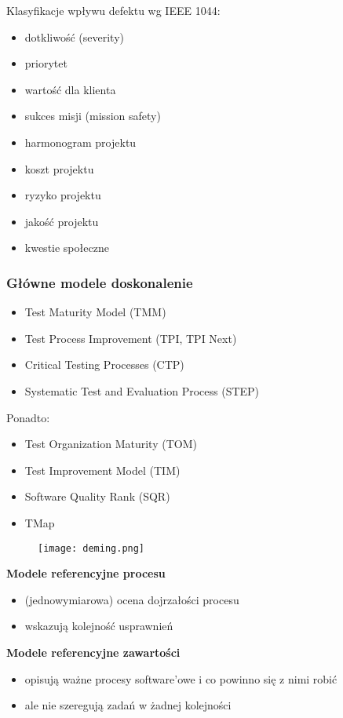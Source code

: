\documentclass[../main.tex]{subfiles}
\begin{document}
    Klasyfikacje wpływu defektu wg IEEE 1044:
    \begin{itemize}
        \item dotkliwość (severity)
        \item priorytet
        \item wartość dla klienta
        \item sukces misji (mission safety)
        \item harmonogram projektu
        \item koszt projektu
        \item ryzyko projektu
        \item jakość projektu
        \item kwestie społeczne
    \end{itemize}

    \subsubsection{Główne modele doskonalenie}
    \begin{itemize}
        \item Test Maturity Model (TMM)
        \item Test Process Improvement (TPI, TPI Next)
        \item Critical Testing Processes (CTP)
        \item Systematic Test and Evaluation Process (STEP)
\end{itemize}

    Ponadto:
    \begin{itemize}
        \item Test Organization Maturity (TOM)
        \item Test Improvement Model (TIM)
        \item Software Quality Rank (SQR)
        \item TMap
\end{itemize}

    \begin{figure}[H]
        \texttt{[image: deming.png]}
    \end{figure}

    \textbf{Modele referencyjne procesu}
    \begin{itemize}
        \item (jednowymiarowa) ocena dojrzałości procesu
        \item wskazują kolejność usprawnień
\end{itemize}

    \textbf{Modele referencyjne zawartości}
    \begin{itemize}
        \item opisują ważne procesy software’owe i co powinno się z nimi robić
        \item ale nie szeregują zadań w żadnej kolejności
\end{itemize}
\end{document}
